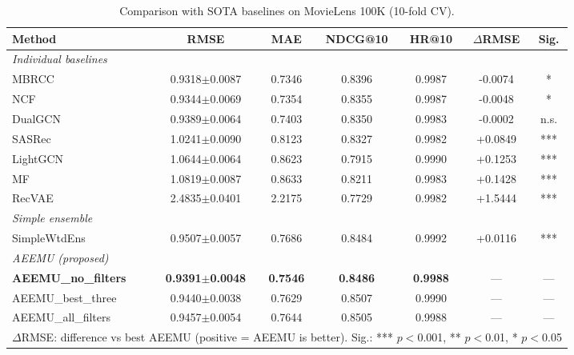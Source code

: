 \begin{table}[htbp]
\centering
\caption{Comparison with SOTA baselines on MovieLens 100K (10-fold CV).}
\label{tab:sota-movielens-100k}
\begin{adjustbox}{max width=\textwidth}
\begin{tabular}{l ccc cc c}
\toprule
\textbf{Method} & \textbf{RMSE} & \textbf{MAE} & \textbf{NDCG@10} & \textbf{HR@10} & \textbf{$\Delta$RMSE} & \textbf{Sig.} \\
\midrule
\multicolumn{7}{l}{\textit{Individual baselines}} \\
MBRCC & 0.9318$\pm$0.0087 & 0.7346 & 0.8396 & 0.9987 & -0.0074 & * \\
NCF & 0.9344$\pm$0.0069 & 0.7354 & 0.8355 & 0.9987 & -0.0048 & * \\
DualGCN & 0.9389$\pm$0.0064 & 0.7403 & 0.8350 & 0.9983 & -0.0002 & n.s. \\
SASRec & 1.0241$\pm$0.0090 & 0.8123 & 0.8327 & 0.9982 & +0.0849 & *** \\
LightGCN & 1.0644$\pm$0.0064 & 0.8623 & 0.7915 & 0.9990 & +0.1253 & *** \\
MF & 1.0819$\pm$0.0087 & 0.8633 & 0.8211 & 0.9983 & +0.1428 & *** \\
RecVAE & 2.4835$\pm$0.0401 & 2.2175 & 0.7729 & 0.9982 & +1.5444 & *** \\
\midrule
\multicolumn{7}{l}{\textit{Simple ensemble}} \\
SimpleWtdEns & 0.9507$\pm$0.0057 & 0.7686 & 0.8484 & 0.9992 & +0.0116 & *** \\
\midrule
\multicolumn{7}{l}{\textit{AEEMU (proposed)}} \\
\textbf{AEEMU\_no\_filters} & \textbf{0.9391$\pm$0.0048} & \textbf{0.7546} & \textbf{0.8486} & \textbf{0.9988} & --- & --- \\
AEEMU\_best\_three & 0.9440$\pm$0.0038 & 0.7629 & 0.8507 & 0.9990 & --- & --- \\
AEEMU\_all\_filters & 0.9457$\pm$0.0054 & 0.7644 & 0.8505 & 0.9988 & --- & --- \\
\bottomrule
\multicolumn{7}{l}{\footnotesize $\Delta$RMSE: difference vs best AEEMU (positive = AEEMU is better). Sig.: *** $p<$0.001, ** $p<$0.01, * $p<$0.05} \\
\end{tabular}
\end{adjustbox}
\end{table}